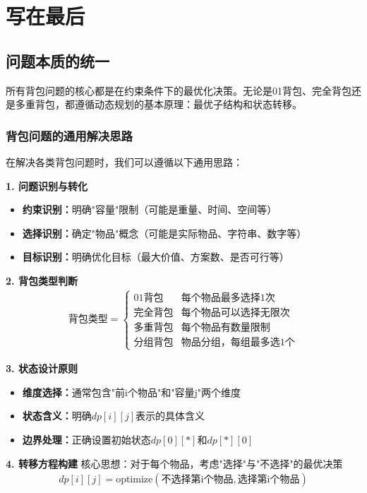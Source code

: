 \section{写在最后}

\subsection{问题本质的统一}
所有背包问题的核心都是在约束条件下的最优化决策。无论是01背包、完全背包还是多重背包，都遵循动态规划的基本原理：最优子结构和状态转移。

\subsubsection{背包问题的通用解决思路}

在解决各类背包问题时，我们可以遵循以下通用思路：

\textbf{1. 问题识别与转化}
\begin{itemize}
\item \textbf{约束识别：}明确"容量"限制（可能是重量、时间、空间等）
\item \textbf{选择识别：}确定"物品"概念（可能是实际物品、字符串、数字等）
\item \textbf{目标识别：}明确优化目标（最大价值、方案数、是否可行等）
\end{itemize}

\textbf{2. 背包类型判断}
\begin{align}
\text{背包类型} = \begin{cases}
\text{01背包} & \text{每个物品最多选择1次} \\
\text{完全背包} & \text{每个物品可以选择无限次} \\
\text{多重背包} & \text{每个物品有数量限制} \\
\text{分组背包} & \text{物品分组，每组最多选1个}
\end{cases}
\end{align}

\textbf{3. 状态设计原则}
\begin{itemize}
\item \textbf{维度选择：}通常包含"前i个物品"和"容量j"两个维度
\item \textbf{状态含义：}明确$dp[i][j]$表示的具体含义
\item \textbf{边界处理：}正确设置初始状态$dp[0][*]$和$dp[*][0]$
\end{itemize}

\textbf{4. 转移方程构建}
核心思想：对于每个物品，考虑"选择"与"不选择"的最优决策
\begin{align}
dp[i][j] = \text{optimize}(\text{不选择第i个物品}, \text{选择第i个物品})
\end{align}

